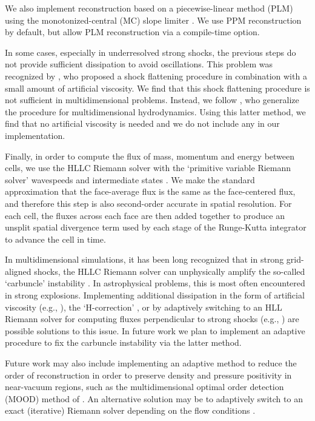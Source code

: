 \documentclass[fleqn,usenatbib]{mnras}
\begin{document}
We also implement reconstruction based on a piecewise-linear method (PLM) using the monotonized-central (MC) slope limiter \citep{VanLeer_1977}. We use PPM reconstruction by default, but allow PLM reconstruction via a compile-time option.

In some cases, especially in underresolved strong shocks, the previous steps do not provide sufficient dissipation to avoid oscillations. This problem was recognized by , who proposed a shock flattening procedure in combination with a small amount of artificial viscosity. We find that this shock flattening procedure is not sufficient in multidimensional problems. Instead, we follow \cite{Miller_2002}, who generalize the  procedure for multidimensional hydrodynamics. Using this latter method, we find that no artificial viscosity is needed and we do not include any in our implementation.

Finally, in order to compute the flux of mass, momentum and energy between cells, we use the HLLC Riemann solver with the `primitive variable Riemann solver' wavespeeds and intermediate states \citep{Toro_2013}. We make the standard approximation that the face-average flux is the same as the face-centered flux, and therefore this step is also second-order accurate in spatial resolution. For each cell, the fluxes across each face are then added together to produce an unsplit spatial divergence term used by each stage of the Runge-Kutta integrator to advance the cell in time.

In multidimensional simulations, it has been long recognized that in strong grid-aligned shocks, the HLLC Riemann solver can unphysically amplify the so-called `carbuncle' instability \citep{Quirk_1994}. In astrophysical problems, this is most often encountered in strong explosions. Implementing additional dissipation in the form of artificial viscosity (e.g., \citealt{Gittings_2008}), the `H-correction' \citep{Sanders_1998}, or by adaptively switching to an HLL Riemann solver \citep{Harten_1983} for computing fluxes perpendicular to strong shocks (e.g., \citealt{Quirk_1994,Skinner_2019}) are possible solutions to this issue. In future work we plan to implement an adaptive procedure to fix the carbuncle instability via the latter method.

Future work may also include implementing an adaptive method to reduce the order of reconstruction in order to preserve density and pressure positivity in near-vacuum regions, such as the multidimensional optimal order detection (MOOD) method of \cite{Clain_2011}. An alternative solution may be to adaptively switch to an exact (iterative) Riemann solver depending on the flow conditions \citep{Toro_2013}.
\end{document}
